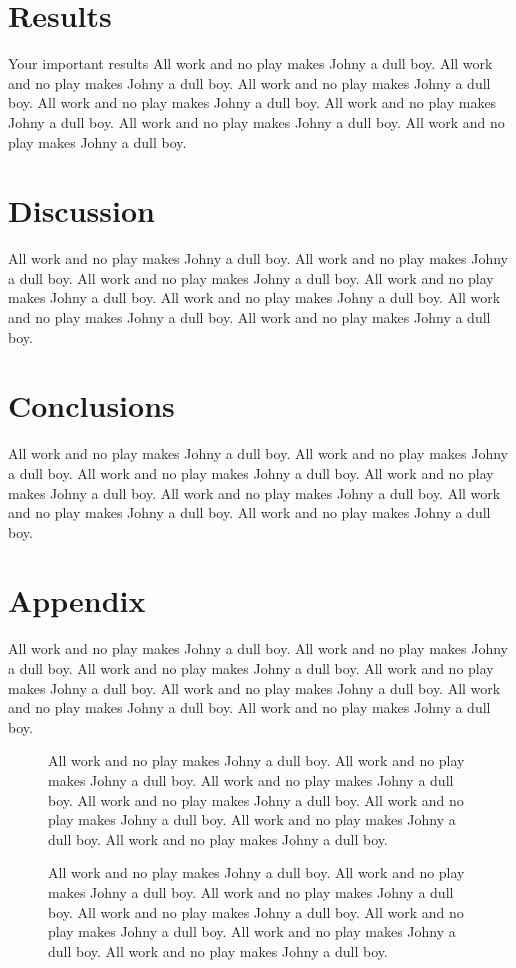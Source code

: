 \documentclass[12pt]{orstthesis}
\begin{document}
\chapter{Results}
Your important results
All work and no play makes Johny a dull boy.
All work and no play makes Johny a dull boy.
All work and no play makes Johny a dull boy.
All work and no play makes Johny a dull boy.
All work and no play makes Johny a dull boy.
All work and no play makes Johny a dull boy.
All work and no play makes Johny a dull boy.
\chapter{Discussion}
All work and no play makes Johny a dull boy.
All work and no play makes Johny a dull boy.
All work and no play makes Johny a dull boy.
All work and no play makes Johny a dull boy.
All work and no play makes Johny a dull boy.
All work and no play makes Johny a dull boy.
All work and no play makes Johny a dull boy.
\chapter{Conclusions}
All work and no play makes Johny a dull boy.
All work and no play makes Johny a dull boy.
All work and no play makes Johny a dull boy.
All work and no play makes Johny a dull boy.
All work and no play makes Johny a dull boy.
All work and no play makes Johny a dull boy.
All work and no play makes Johny a dull boy.


\backmatter
\appendix
\chapter{Appendix}
All work and no play makes Johny a dull boy.
All work and no play makes Johny a dull boy.
All work and no play makes Johny a dull boy.
All work and no play makes Johny a dull boy.
All work and no play makes Johny a dull boy.
All work and no play makes Johny a dull boy.
All work and no play makes Johny a dull boy.
\begin{figure}
\caption[
All work and no play makes Johny a dull boy.
]{
All work and no play makes Johny a dull boy.
All work and no play makes Johny a dull boy.
All work and no play makes Johny a dull boy.
All work and no play makes Johny a dull boy.
All work and no play makes Johny a dull boy.
All work and no play makes Johny a dull boy.
All work and no play makes Johny a dull boy.
}
\end{figure}
\begin{figure}
\caption[
All work and no play makes Johny a dull boy.
]{
All work and no play makes Johny a dull boy.
All work and no play makes Johny a dull boy.
All work and no play makes Johny a dull boy.
All work and no play makes Johny a dull boy.
All work and no play makes Johny a dull boy.
All work and no play makes Johny a dull boy.
All work and no play makes Johny a dull boy.
}
\end{figure}

\printindex
\flyleaf
\end{document}
